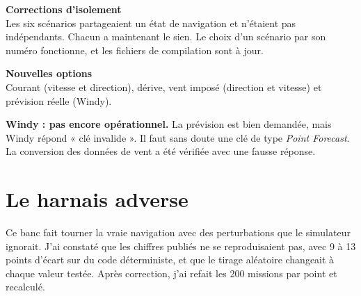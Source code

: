 \documentclass[11pt,a4paper]{article}
\begin{document}
\noindent
\begin{minipage}[t]{0.485\linewidth}
\begin{info}\textbf{Corrections d'isolement}\\\small Les six scénarios partageaient un état de navigation et
n'étaient pas indépendants. Chacun a maintenant le sien. Le choix d'un scénario par son numéro fonctionne, et les
fichiers de compilation sont à jour.\end{info}
\end{minipage}\hfill
\begin{minipage}[t]{0.485\linewidth}
\begin{info}\textbf{Nouvelles options}\\\small Courant (vitesse et direction), dérive, vent imposé (direction et
vitesse) et prévision réelle (Windy).\end{info}
\end{minipage}

\begin{caution}
\textbf{Windy : pas encore opérationnel.} La prévision est bien demandée, mais Windy répond « clé invalide ». Il faut
sans doute une clé de type \emph{Point Forecast}. La conversion des données de vent a été vérifiée avec une fausse
réponse.
\end{caution}

\section{Le harnais adverse}

Ce banc fait tourner la vraie navigation avec des perturbations que le simulateur ignorait. J'ai constaté que les
chiffres publiés ne se reproduisaient pas, avec 9 à 13 points d'écart sur du code déterministe, et que le tirage
aléatoire changeait à chaque valeur testée. Après correction, j'ai refait les 200 missions par point et recalculé.
\end{document}
